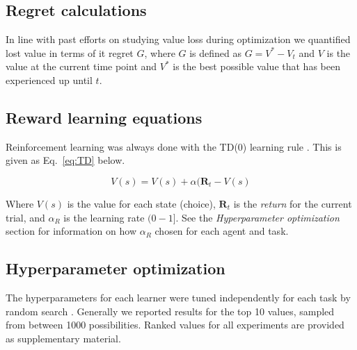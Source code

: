 \subsection*{Regret calculations}
In line with past efforts on studying value loss during optimization we quantified lost value in terms of it regret $G$, where $G$ is defined as $G = V^* - V_t$ and $V$ is the value at the current time point and $V^*$ is the best possible value that has been experienced up until $t$.

\subsection*{Reward learning equations} Reinforcement learning was always done with the TD(0) learning rule \citep{Sutton2018}. This is given as Eq.~\ref{eq:TD} below. 

\begin{equation}
	\label{eq:TD}
	V(s) = V(s) + \alpha (\mathbf{R}_t - V(s)
\end{equation}

Where $V(s)$ is the value for each state (choice), $\mathbf{R}_t$ is the \emph{return} for the current trial, and $\alpha_R$ is the learning rate $(0-1]$. See the \emph{Hyperparameter optimization} section for information on how $\alpha_R$ chosen for each agent and task.

\subsection*{Hyperparameter optimization}
The hyperparameters for each learner were tuned independently for each task by random search \citep{Bergstra2012}. Generally we reported results for the top 10 values, sampled from between 1000 possibilities. Ranked values for all experiments are provided as supplementary material.


